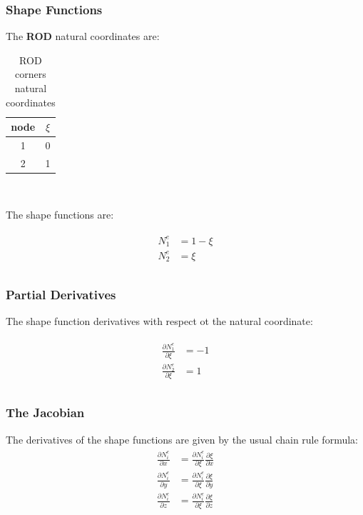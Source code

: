 \documentclass[10pt,b5paper,titlepage]{book}
\newenvironment{eqarray}
{
    \begin{eqnarray}
        \begin{aligned}
}
{
        \end{aligned}
    \end{eqnarray}
}
\begin{document}
\subsubsection{Shape Functions}
The \textbf{ROD} natural coordinates are:

\begin{table}[ht]
    \centering
    \begin{tabular}{|c c |}
        \hline
        node & $\xi$ \\
        \hline
        1 & 0 \\
        2 & 1 \\
        \hline
    \end{tabular}\\
    \caption{ROD corners natural coordinates}
\end{table}

The shape functions are:

\begin{eqarray}
    N_1^e &= 1 - \xi \\
    N_2^e &= \xi \\
\end{eqarray}


\subsubsection{Partial Derivatives}
The shape function derivatives with respect ot the natural coordinate:

\begin{eqarray}
    \frac{\partial N_1^e}{\partial \xi} &= -1 \\
    \frac{\partial N_2^e}{\partial \xi} &= 1 \\
\end{eqarray}

\subsubsection{The Jacobian}

The derivatives of the shape functions are given by the usual chain rule formula:
\begin{eqarray}
    \frac{\partial N_i^e}{\partial x} &= \frac{\partial N_i^e}{\partial \xi}
                                         \frac{\partial \xi}{\partial x} \\
    \frac{\partial N_i^e}{\partial y} &= \frac{\partial N_i^e}{\partial \xi}
                                         \frac{\partial \xi}{\partial y} \\
    \frac{\partial N_i^e}{\partial z} &= \frac{\partial N_i^e}{\partial \xi}
                                         \frac{\partial \xi}{\partial z} \\
\end{eqarray}
\end{document}
